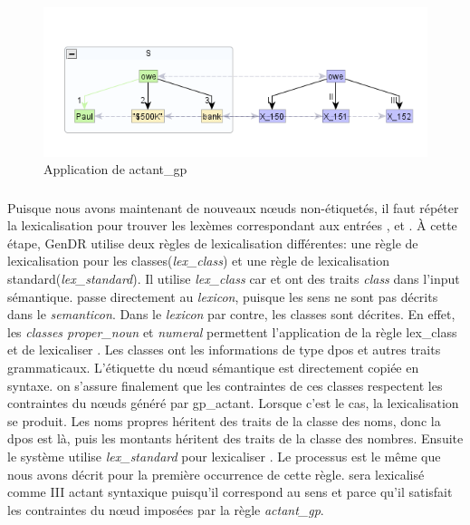 \begin{figure}[htb]
	\centering
	\includegraphics[width=1\textwidth, trim = {0cm 8mm 0cm 15mm},clip]{ch3/figs/actant_gp1.png}
	\caption{Application de actant\_gp}
	\label{fig:actantgp}
\end{figure}

\subsubsection{}

Puisque nous avons maintenant de nouveaux n\oe{}uds non-étiquetés, il faut répéter la lexicalisation pour trouver les lexèmes correspondant aux entrées ,  et . À cette étape, GenDR utilise deux règles de lexicalisation différentes: une règle de lexicalisation pour les classes(\emph{lex\_class}) et une règle de lexicalisation standard(\emph{lex\_standard}). Il utilise \emph{lex\_class} car  et  ont des traits \emph{class} dans l'input sémantique.  passe directement au \emph{lexicon}, puisque les sens ne sont pas décrits dans le \emph{semanticon}. Dans le \emph{lexicon} par contre, les classes sont décrites. En effet, les \emph{classes proper\_noun} et \emph{numeral} permettent l'application de la règle lex\_class et de lexicaliser . Les classes ont les informations de type dpos et autres traits grammaticaux. L'étiquette du n\oe{}ud sémantique est directement copiée en syntaxe. on s'assure finalement que les contraintes de ces classes respectent les contraintes du n\oe{}uds généré par gp\_actant. Lorsque c'est le cas, la lexicalisation se produit. Les noms propres héritent des traits de la classe des noms, donc la dpos est là, puis les montants héritent des traits de la classe des nombres. Ensuite le système utilise \emph{lex\_standard} pour lexicaliser . Le processus est le même que nous avons décrit pour la première occurrence de cette règle. sera lexicalisé comme III actant syntaxique puisqu'il correspond au sens  et parce qu'il satisfait les contraintes du n\oe{}ud imposées par la règle \emph{actant\_gp}.

